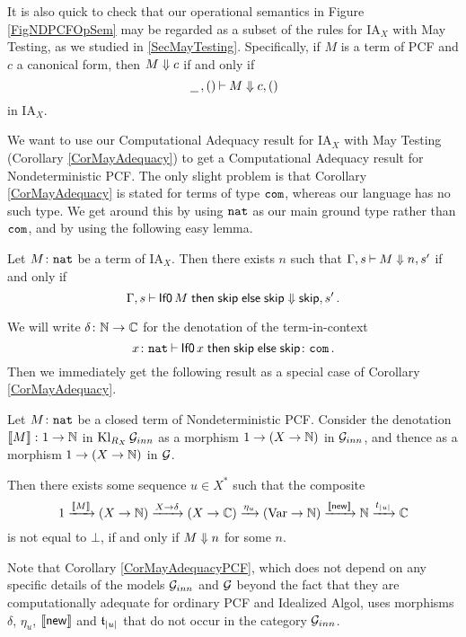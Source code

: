 \documentclass[11pt]{report}
\begin{document}
It is also quick to check that our operational semantics in Figure \ref{FigNDPCFOpSem} may be regarded as a subset of the rules for IA${}_X$ with May Testing, as we studied in \sec \ref{SecMayTesting}.
Specifically, if $M$ is a term of PCF and $c$ a canonical form, then $M\Downarrow c$ if and only if
\[
  \,\underline{\hspace{1.5ex}}\,,()\mathbin{\vdash} M\Downarrow c,()
  \]
in IA${}_X$.

We want to use our Computational Adequacy result for IA${}_X$ with May Testing (Corollary \ref{CorMayAdequacy}) to get a Computational Adequacy result for Nondeterministic PCF.
The only slight problem is that Corollary \ref{CorMayAdequacy} is stated for terms of type ${\mathtt{com}}$, whereas our language has no such type.  
We get around this by using ${\mathtt{nat}}$ as our main ground type rather than ${\mathtt{com}}$, and by using the following easy lemma.

\begin{lemma}
  Let $M\colon{\mathtt{nat}}$ be a term of IA${}_X$.  
  Then there exists $n$ such that $\Gamma,s\mathbin{\vdash} M\Downarrow n,s'$ if and only if
  \[
    \Gamma,s\mathbin{\vdash} \operatorname{{\mathsf{If0}}} M \mathrel{\mathsf{then}} {\mathsf{skip}} \mathrel{\mathsf{else}} {\mathsf{skip}} \Downarrow {\mathsf{skip}}, s'\,.
    \]
\end{lemma}

We will write $\delta\colon \mathbb{N} \to \mathbb{C}$ for the denotation of the term-in-context 
\[
  x\colon{\mathtt{nat}} \mathbin{\vdash} \operatorname{{\mathsf{If0}}} x \mathrel{\mathsf{then}} {\mathsf{skip}} \mathrel{\mathsf{else}} {\mathsf{skip}} \colon {\mathtt{com}}\,.
  \]
Then we immediately get the following result as a special case of Corollary \ref{CorMayAdequacy}.

\begin{corollary}
  Let $M\colon{\mathtt{nat}}$ be a closed term of Nondeterministic PCF.
  Consider the denotation $\left\llbracket M\right\rrbracket \colon 1 \to \mathbb{N}$ in $\operatorname{Kl}_{R_X}\mathcal G_{inn}$ as a morphism $1 \to (X \to \mathbb{N})$ in $\mathcal G_{inn}$, and thence as a morphism $1 \to (X \to \mathbb{N})$ in $\mathcal G$.

  Then there exists some sequence $u\in X^*$ such that the composite
  \[
    1 \xrightarrow{\left\llbracket M\right\rrbracket}
    (X \to \mathbb{N}) \xrightarrow{X \to \delta}
    (X \to \mathbb{C}) \xrightarrow{\eta_u}
    (\operatorname{Var} \to \mathbb{N}) \xrightarrow{\left\llbracket\operatorname{{\mathsf{new}}}\right\rrbracket}
    \mathbb{N} \xrightarrow{t_{|u|}}
    \mathbb{C}
    \]
  is not equal to $\bot$, if and only if $M\Downarrow n$ for some $n$.
  \label{CorMayAdequacyPCF}
\end{corollary}

Note that Corollary \ref{CorMayAdequacyPCF}, which does not depend on any specific details of the models $\mathcal G_{inn}$ and $\mathcal G$ beyond the fact that they are computationally adequate for ordinary PCF and Idealized Algol, uses morphisms $\delta$, $\eta_u$, $\left\llbracket\operatorname{{\mathsf{new}}}\right\rrbracket$ and $\mathfrak t_{|u|}$ that do not occur in the category $\mathcal G_{inn}$.
\end{document}
